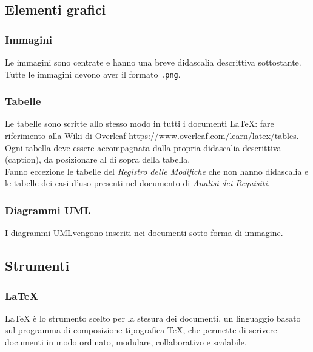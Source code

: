 \subsection{Elementi grafici}
\subsubsection{Immagini}
Le immagini sono centrate e hanno una breve didascalia descrittiva sottostante. Tutte le immagini devono aver il formato \texttt{.png}\glo.

\subsubsection{Tabelle}
Le tabelle sono scritte allo stesso modo in tutti i documenti \LaTeX{}: fare riferimento alla Wiki di Overleaf \url{https://www.overleaf.com/learn/latex/tables}. \\
Ogni tabella deve essere accompagnata dalla propria didascalia descrittiva (caption), da posizionare al di sopra della tabella. \\
Fanno eccezione le tabelle del \textit{Registro delle Modifiche} che non hanno didascalia e le tabelle dei casi d'uso presenti nel documento di \textit{Analisi dei Requisiti}.

\subsubsection{Diagrammi UML}
I diagrammi UML\glo vengono inseriti nei documenti sotto forma di immagine.

\subsection{Strumenti}
\subsubsection{\LaTeX{}}
\LaTeX{} è lo strumento scelto per la stesura dei documenti, un linguaggio basato sul programma di composizione tipografica \TeX{}, che permette di scrivere documenti in modo ordinato, modulare, collaborativo e scalabile.

